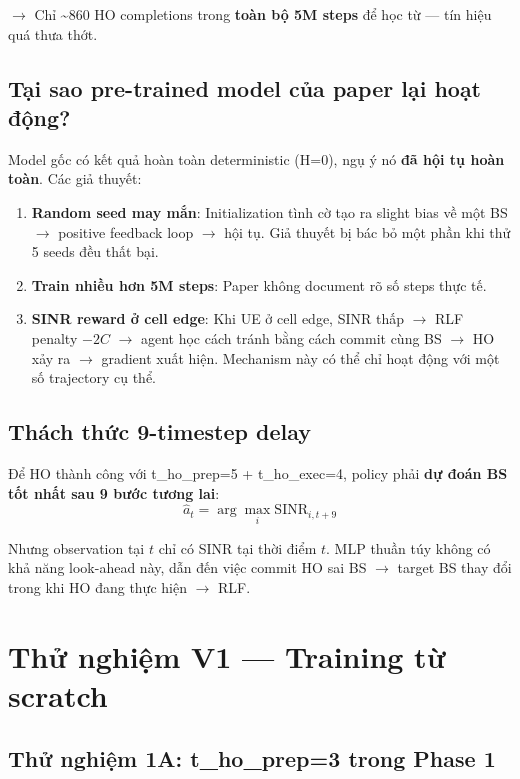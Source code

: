 \documentclass[11pt]{article}
\begin{document}
$\rightarrow$ Chỉ \textasciitilde 860 HO completions trong \textbf{toàn bộ 5M steps} để học từ --- tín hiệu quá thưa thớt.

\subsection{Tại sao pre-trained model của paper lại hoạt động?}

Model gốc có kết quả hoàn toàn deterministic (H=0), ngụ ý nó \textbf{đã hội tụ hoàn toàn}. Các giả thuyết:

\begin{enumerate}
  \item \textbf{Random seed may mắn}: Initialization tình cờ tạo ra slight bias về một BS $\rightarrow$ positive feedback loop $\rightarrow$ hội tụ. Giả thuyết bị bác bỏ một phần khi thử 5 seeds đều thất bại.
  \item \textbf{Train nhiều hơn 5M steps}: Paper không document rõ số steps thực tế.
  \item \textbf{SINR reward ở cell edge}: Khi UE ở cell edge, SINR thấp $\rightarrow$ RLF penalty $-2C$ $\rightarrow$ agent học cách tránh bằng cách commit cùng BS $\rightarrow$ HO xảy ra $\rightarrow$ gradient xuất hiện. Mechanism này có thể chỉ hoạt động với một số trajectory cụ thể.
\end{enumerate}

\subsection{Thách thức 9-timestep delay}

Để HO thành công với t\_ho\_prep=5 + t\_ho\_exec=4, policy phải \textbf{dự đoán BS tốt nhất sau 9 bước tương lai}:
\[
\hat{a}_t = \arg\max_i \text{SINR}_{i,t+9}
\]

Nhưng observation tại $t$ chỉ có SINR tại thời điểm $t$. MLP thuần túy không có khả năng look-ahead này, dẫn đến việc commit HO sai BS $\rightarrow$ target BS thay đổi trong khi HO đang thực hiện $\rightarrow$ RLF.

\section{Thử nghiệm V1 --- Training từ scratch}

\subsection{Thử nghiệm 1A: t\_ho\_prep=3 trong Phase 1}
\end{document}
